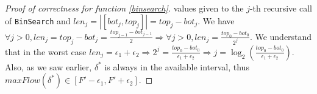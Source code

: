 \documentclass[11pt]{article}
\theoremstyle{definition}
\theoremstyle{corollary}
\theoremstyle{lemma}
\begin{document}
\begin{proof}[Proof of correctness for function \ref{binsearch}]
       values given to the $j$-th recursive call of \texttt{BinSearch} and $len_j =|[bot_j, top_j]| = top_j - bot_j$. We have
       $\forall j > 0, len_j = top_j - bot_j = \frac{top_{j-1} - bot_{j-1}}{2} \Rightarrow \forall j >0, len_j =
       \frac{top_0 - bot_0}{2^j}$. We understand that in the worst case $len_j = \epsilon_1 + \epsilon_2 \Rightarrow
       2^j = \frac{top_0-bot_0}{\epsilon_1 + \epsilon_2} \Rightarrow j = \log_2(\frac{top_0-bot_0}{\epsilon_1+\epsilon_2})$.
       Also, as we saw earlier, $\delta^*$ is always in the available interval, thus $maxFlow(\delta^*) \in [F' - \epsilon_1,
       F' + \epsilon_2]$.
    \end{proof}
\end{document}
